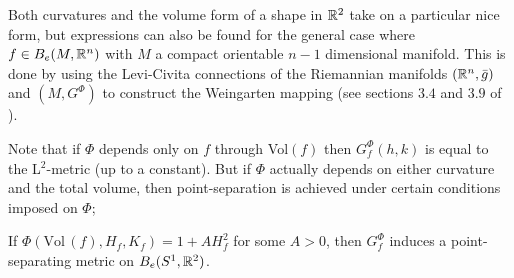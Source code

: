 \begin{remark}
Both curvatures and the volume form of a shape in $\mathbb{R}^2$ take on a particular nice form, but expressions can also be found for the general case where $f \in  B_e(M, \mathbb{R}^n)$ with $M$ a compact orientable $n-1$ dimensional manifold. This is done by using the Levi-Civita connections of the Riemannian manifolds $(\mathbb{R}^n,\bar{g})$ and $(M,G^\Phi)$ to construct the Weingarten mapping (see sections $3.4$ and $3.9$ of \cite{bauer2010almost}).   
\end{remark}
Note that if $\Phi$ depends only on $f$ through Vol$(f)$ then $G_f^\Phi (h,k)$ is equal to the L$^2$-metric (up to a constant). But if $\Phi$ actually depends on either curvature and the total volume, then point-separation is achieved under certain conditions imposed on $\Phi$;

\begin{theorem}\label{point_sep}
If $\Phi(\text{Vol} \, (f), H_f, K_f) = 1 + A H_f^2$ for some $A > 0$, then $G_f^\Phi$ induces a point-separating metric on $B_e(S^1, \mathbb{R}^2)$.
\end{theorem}

